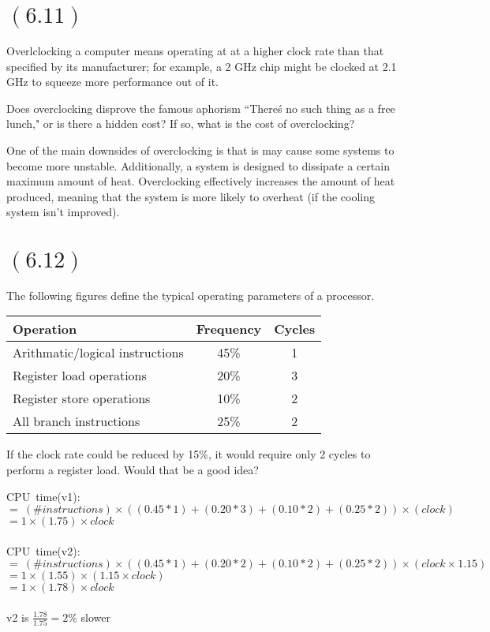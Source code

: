 \documentclass[letterpaper,12pt,titlepage]{article}
\begin{document}
\section*{$(6.11)$} Overlclocking a computer means operating at at a higher clock rate than that specified by its manufacturer; for example, a 2 GHz chip might be clocked at 2.1 GHz to squeeze more performance out of it.

Does overclocking disprove the famous aphorism ``There\'s no such thing as a free lunch," or is there a hidden cost? If so, what is the cost of overclocking?

\begin{mdframed}[style=MyFrame]
    One of the main downsides of overclocking is that is may cause some systems to become more unstable. Additionally, a system is designed to dissipate a certain maximum amount of heat. Overclocking effectively increases the amount of heat produced, meaning that the system is more likely to overheat (if the cooling system isn't improved).
\end{mdframed}
\newpage
\section*{$(6.12)$} The following figures define the typical operating parameters of a processor.\\
\begin{center}
\begin{tabular}{l | c | c}
\textbf{Operation} & \textbf{Frequency} & \textbf{Cycles}\\ \hline
Arithmatic/logical instructions& 45\% & 1\\
Register load operations& 20\% & 3\\
Register store operations& 10\% & 2\\
All branch instructions& 25\% & 2 \\
\end{tabular}
\end{center}

If the clock rate could be reduced by 15\%, it would require only 2 cycles to perform a register load. Would that be a good idea?
\begin{mdframed}[style=MyFrame]

CPU~time(v1):\\
$=~(\# instructions)\times ((0.45*1)+(0.20*3)+(0.10*2)+(0.25*2))\times (clock)$\\
$=1\times(1.75)\times clock$ \\ \\
CPU~time(v2):\\
$=~(\# instructions)\times ((0.45*1)+(0.20*2)+(0.10*2)+(0.25*2))\times (clock \times 1.15)$\\
$=1\times(1.55)\times (1.15\times clock)$ \\
$=1\times(1.78)\times clock$ \\ \\
v2 is $\frac{1.78}{1.75} = 2\% $ slower
\end{mdframed}
\newpage
\end{document}
